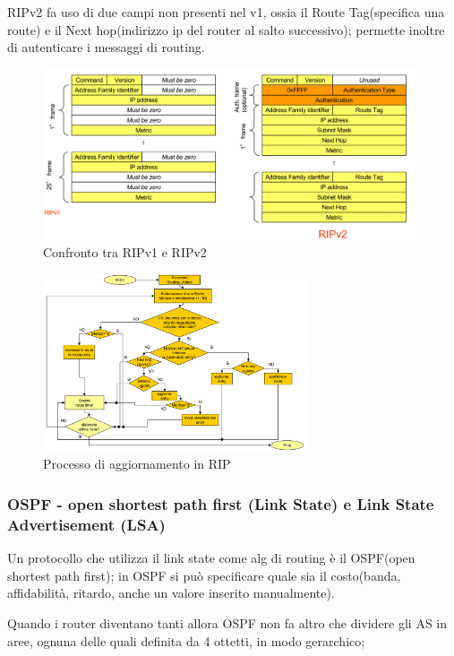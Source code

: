  RIPv2 fa uso di due campi non presenti nel v1, ossia il Route Tag(specifica una route) e il Next hop(indirizzo ip del router al salto successivo);
 permette inoltre di autenticare i messaggi di routing.
\begin{figure}[h!]
    \centering
    \includegraphics[width=1\textwidth]{images/RIPversioni.png}
    \caption{Confronto tra RIPv1 e RIPv2}
    \label{fig:ripversioni}
\end{figure}

\begin{figure}[h!]
    \centering
    \includegraphics[width=0.7\textwidth]{images/processoRIP.png}
    \caption{Processo di aggiornamento in RIP}
    \label{fig:processoRIP}
\end{figure}
\newpage
\subsubsection{OSPF - open shortest path first (Link State) e Link State Advertisement (LSA)}

Un protocollo che utilizza il link state come alg di routing è il OSPF(open shortest path first);
in OSPF si può specificare quale sia il costo(banda, affidabilità, ritardo, anche un valore inserito manualmente).

Quando i router diventano tanti allora OSPF non fa altro che dividere gli AS in aree, ognuna delle quali definita da 4 ottetti, in modo gerarchico;
